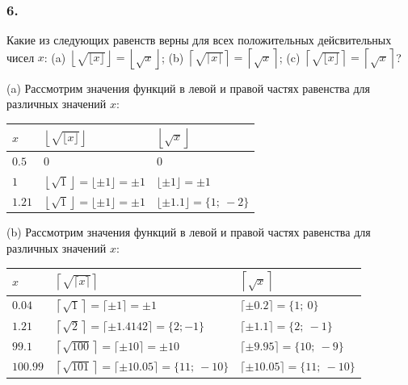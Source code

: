 \documentclass{book}
\begin{document}
\subsubsection{6.}
Какие из следующих равенств верны для всех положительных дейсвительных чисел $x$: (a) $\left\lfloor\sqrt{\lfloor x\rfloor}\right\rfloor=\left\lfloor\sqrt{x}\right\rfloor$; (b) $\left\lceil\sqrt{\lceil x\rceil}\right\rceil=\left\lceil\sqrt{x}\right\rceil$; (c) $\left\lceil\sqrt{\lfloor x\rfloor}\right\rceil=\left\lceil\sqrt{x}\right\rceil$?

(a) Рассмотрим значения функций в левой и правой частях равенства для различных значений $x$:

\begin{tabularx}{1\textwidth} { 
  | >{\raggedright\arraybackslash}X 
  | >{\centering\arraybackslash}X
  | >{\centering\arraybackslash}X | }
 \hline  $x$ & $\left\lfloor\sqrt{\lfloor x\rfloor}\right\rfloor$ & $\left\lfloor\sqrt{x}\right\rfloor$ \\
 \hline  $0.5$ & $0$ & $0$ \\
 \hline  $1$ & $\left\lfloor\sqrt{1}\right\rfloor=\lfloor\pm 1\rfloor=\pm 1$ & $\lfloor\pm 1\rfloor=\pm 1$ \\
 \hline  $1.21$ & $\left\lfloor\sqrt{1}\right\rfloor=\lfloor\pm 1\rfloor=\pm 1$ & $\lfloor\pm 1.1\rfloor=\{1;\ -2\}$ \\
 \hline
\end{tabularx}

(b) Рассмотрим значения функций в левой и правой частях равенства для различных значений $x$:

\begin{tabularx}{1\textwidth} { 
  | >{\raggedright\arraybackslash}X 
  | >{\centering\arraybackslash}X
  | >{\centering\arraybackslash}X | }
 \hline  $x$ & $\left\lceil\sqrt{\lceil x\rceil}\right\rceil$ & $\left\lceil\sqrt{x}\right\rceil$ \\
 \hline  $0.04$ & $\left\lceil\sqrt{1}\right\rceil=\lceil\pm 1\rceil=\pm 1$ & $\lceil\pm 0.2\rceil=\{1;\ 0\}$ \\
 \hline  $1.21$ & $\left\lceil\sqrt{2}\right\rceil=\lceil\pm 1.4142\rceil=\{2; -1\}$ & $\lceil\pm 1.1\rceil=\{2;\ -1\}$ \\
 \hline  $99.1$ & $\left\lceil\sqrt{100}\right\rceil=\lceil\pm 10\rceil=\pm 10$ & $\lceil\pm 9.95\rceil=\{10;\ -9\}$ \\
 \hline  $100.99$ & $\left\lceil\sqrt{101}\right\rceil=\lceil\pm 10.05\rceil=\{11;\ -10\}$ & $\lceil\pm 10.05\rceil=\{11;\ -10\}$ \\
 \hline
\end{tabularx}
\end{document}
